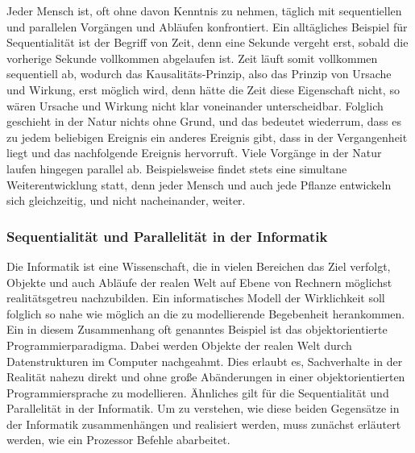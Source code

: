 				Jeder Mensch ist, oft ohne davon Kenntnis zu nehmen, täglich mit sequentiellen und parallelen Vorgängen und Abläufen konfrontiert. Ein alltägliches Beispiel für Sequentialität ist der Begriff von Zeit, denn eine Sekunde vergeht erst, sobald die vorherige Sekunde vollkommen abgelaufen ist. Zeit läuft somit vollkommen sequentiell ab, wodurch das Kausalitäts-Prinzip, also das Prinzip von Ursache und Wirkung, erst möglich wird, denn hätte die Zeit diese Eigenschaft nicht, so wären Ursache und Wirkung nicht klar voneinander unterscheidbar. Folglich geschieht in der Natur nichts ohne Grund, und das bedeutet wiederrum, dass es zu jedem beliebigen Ereignis ein anderes Ereignis gibt, dass in der Vergangenheit liegt und das nachfolgende Ereignis hervorruft. \cite{Kausalitaet} Viele Vorgänge in der Natur laufen hingegen parallel ab. Beispielsweise findet stets eine simultane Weiterentwicklung statt, denn jeder Mensch und auch jede Pflanze entwickeln sich gleichzeitig, und nicht nacheinander, weiter. \cite{ParaProgLoogen}
				
			\subsubsection{Sequentialität und Parallelität in der Informatik}
			\label{SequUndParaInformatik}
				
				Die Informatik ist eine Wissenschaft, die in vielen Bereichen das Ziel verfolgt, Objekte und auch Abläufe der realen Welt auf Ebene von Rechnern möglichst realitätsgetreu nachzubilden. Ein informatisches Modell der Wirklichkeit soll folglich so nahe wie möglich an die zu modellierende Begebenheit herankommen. Ein in diesem Zusammenhang oft genanntes Beispiel ist das objektorientierte Programmierparadigma. Dabei werden Objekte der realen Welt durch Datenstrukturen im Computer nachgeahmt. Dies erlaubt es, Sachverhalte in der Realität nahezu direkt und ohne große Abänderungen in einer objektorientierten Programmiersprache zu modellieren. \cite{Objektorientierung} Ähnliches gilt für die Sequentialität und Parallelität in der Informatik. Um zu verstehen, wie diese beiden Gegensätze in der Informatik zusammenhängen und realisiert werden, muss zunächst erläutert werden, wie ein Prozessor Befehle abarbeitet.
				
